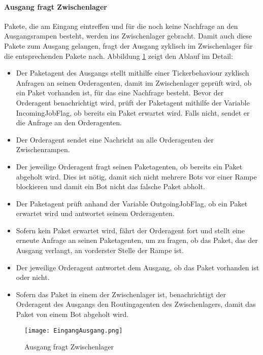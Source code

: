 \paragraph{Ausgang fragt Zwischenlager}
Pakete, die am Eingang eintreffen und für die noch keine Nachfrage an den Ausgangsrampen besteht, werden ins Zwischenlager gebracht. Damit auch diese Pakete zum Ausgang gelangen, fragt der Ausgang zyklisch im Zwischenlager für die entsprechenden Pakete nach. Abbildung \ref{Ausgang fragt} zeigt den Ablauf im Detail:
\begin{itemize}
\item Der Paketagent des Ausgangs stellt mithilfe einer Tickerbehaviour zyklisch Anfragen an seinen Orderagenten, damit im Zwischenlager geprüft wird, ob ein Paket vorhanden ist, für das eine Nachfrage besteht. Bevor der Orderagent benachrichtigt wird, prüft der Paketagent mithilfe der Variable IncomingJobFlag, ob bereits ein Paket erwartet wird. Falls nicht, sendet er die Anfrage an den Orderagenten.  
\item Der Orderagent sendet eine Nachricht an alle Orderagenten der Zwischenrampen.
\item Der jeweilige Orderagent fragt seinen Paketagenten, ob bereits ein Paket abgeholt wird. Dies ist nötig, damit sich nicht mehrere Bots vor einer Rampe blockieren und damit ein Bot nicht das falsche Paket abholt.
\item Der Paketagent prüft anhand der Variable OutgoingJobFlag, ob ein Paket erwartet wird und antwortet seinem Orderagenten.
\item Sofern kein Paket erwartet wird, fährt der Orderagent fort und stellt eine erneute Anfrage an seinen Paketagenten, um zu fragen, ob das Paket, das der Ausgang verlangt, an vorderster Stelle der Rampe ist.
\item Der jeweilige Orderagent antwortet dem Ausgang, ob das Paket vorhanden ist oder nicht.
\item Sofern das Paket in einem der Zwischenlager ist, benachrichtigt der Orderagent des Ausgangs den Routingagenten des Zwischenlagers, damit das Paket von einem Bot abgeholt wird. 
\end{itemize} 
\begin{figure}[h!]
	\centering
		\texttt{[image: EingangAusgang.png]}        
		\caption{Ausgang fragt Zwischenlager}
	\label{Ausgang fragt}
\end{figure}
